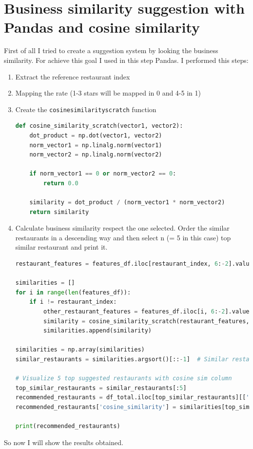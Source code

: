 \documentclass[12pt,english]{report}
\begin{document}
\section{Business similarity suggestion with Pandas and cosine similarity}
First of all I tried to create a suggestion system by looking the business similarity. For achieve this goal I used in this step Pandas. I performed this steps:
\begin{enumerate}
\item Extract the reference restaurant index
\item Mapping the rate (1-3 stars will be mapped in 0 and 4-5 in 1)
\item Create the \texttt{cosine\textunderscore similarity\textunderscore scratch} function
\begin{lstlisting}[language={Python},escapechar=|,label={lst:cosinesim},caption={Cosine similarity function}]
def cosine_similarity_scratch(vector1, vector2):
    dot_product = np.dot(vector1, vector2)
    norm_vector1 = np.linalg.norm(vector1)
    norm_vector2 = np.linalg.norm(vector2)
    
    if norm_vector1 == 0 or norm_vector2 == 0:
        return 0.0
    
    similarity = dot_product / (norm_vector1 * norm_vector2)
    return similarity

\end{lstlisting}
\item Calculate business similarity respect the one selected. Order the similar restaurants in a descending way and then select n (= 5 in this case) top similar restaurant and print it.
\begin{lstlisting}[language={Python},escapechar=|,label={lst:simpandas},caption={Suggestion system in Pandas}]
restaurant_features = features_df.iloc[restaurant_index, 6:-2].values  # Reference restaurant feature vector

similarities = []
for i in range(len(features_df)):
    if i != restaurant_index:
        other_restaurant_features = features_df.iloc[i, 6:-2].values
        similarity = cosine_similarity_scratch(restaurant_features, other_restaurant_features)
        similarities.append(similarity)

similarities = np.array(similarities)
similar_restaurants = similarities.argsort()[::-1]  # Similar restaurant ordered in a desc way

# Visualize 5 top suggested restaurants with cosine sim column
top_similar_restaurants = similar_restaurants[:5]
recommended_restaurants = df_total.iloc[top_similar_restaurants][['name', 'stars']]
recommended_restaurants['cosine_similarity'] = similarities[top_similar_restaurants]

print(recommended_restaurants)

\end{lstlisting}
\end{enumerate}
So now I will show the results obtained.
\end{document}
